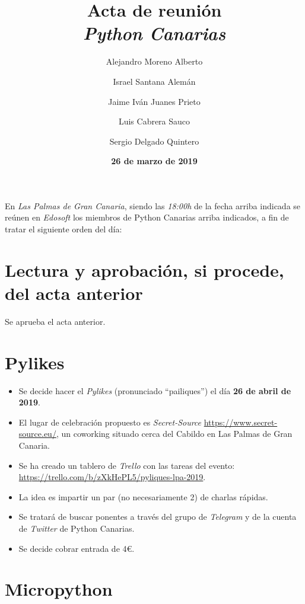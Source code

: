 \documentclass[a4paper, 12pt]{article}
\title{\huge \textbf{Acta de reunión} \\ \textit{Python Canarias}}
\date{\textbf{26 de marzo de 2019}}
\author{
    Alejandro Moreno Alberto \and
    Israel Santana Alemán \and
    Jaime Iván Juanes Prieto \and
    Luis Cabrera Sauco \and
    Sergio Delgado Quintero
}
\begin{document}
\renewcommand{\contentsname}{Orden del día}

\maketitle

En \textit{Las Palmas de Gran Canaria}, siendo las \textit{18:00h} de la fecha arriba indicada se reúnen en \textit{Edosoft} los miembros de Python Canarias arriba indicados, a fin de tratar el siguiente orden del día:

\tableofcontents

\section{Lectura y aprobación, si procede, del acta anterior}

Se aprueba el acta anterior.

\section{Pylikes}

\begin{itemize}
    \item Se decide hacer el \textit{Pylikes} (pronunciado ``pailiques'') el día \textbf{26 de abril de 2019}.
    \item El lugar de celebración propuesto es \textit{Secret-Source} \url{https://www.secret-source.eu/}, un coworking situado cerca del Cabildo en Las Palmas de Gran Canaria.
    \item Se ha creado un tablero de \textit{Trello} con las tareas del evento: \url{https://trello.com/b/zXkHePL5/pyliques-lpa-2019}.
    \item La idea es impartir un par (no necesariamente 2) de charlas rápidas.
    \item Se tratará de buscar ponentes a través del grupo de \textit{Telegram} y de la cuenta de \textit{Twitter} de Python Canarias.
    \item Se decide cobrar entrada de 4\euro.
\end{itemize}

\section{Micropython}
\end{document}
